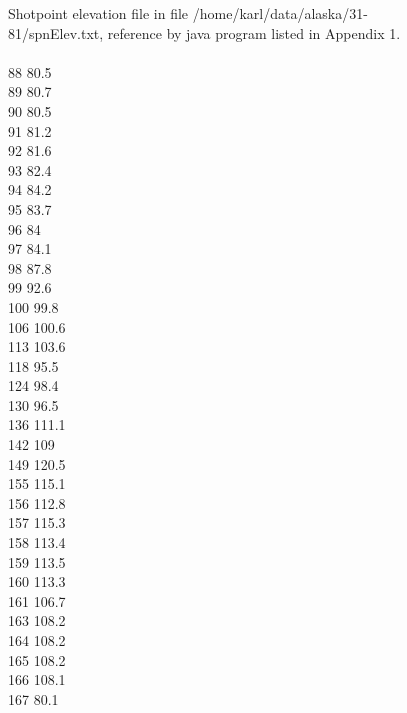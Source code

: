 Shotpoint elevation file in file /home/karl/data/alaska/31-\\
81/spnElev.txt, reference by java program listed in Appendix 1. \\
 \\
88	80.5 \\
89	80.7 \\
90	80.5 \\
91	81.2 \\
92	81.6 \\
93	82.4 \\
94	84.2 \\
95	83.7 \\
96	84 \\
97	84.1 \\
98	87.8 \\
99	92.6 \\
100	99.8 \\
106	100.6 \\
113	103.6 \\
118	95.5 \\
124	98.4 \\
130	96.5 \\
136	111.1 \\
142	109 \\
149	120.5 \\
155	115.1 \\
156	112.8 \\
157	115.3 \\
158	113.4 \\
159	113.5 \\
160	113.3 \\
161	106.7 \\
163	108.2 \\
164	108.2 \\
165	108.2 \\
166	108.1 \\
167     80.1	 